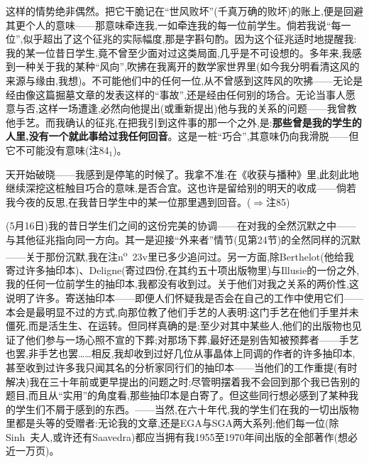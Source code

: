 这样的情势绝非偶然。把它干脆记在“世风败坏”(千真万确的败坏)的账上,便是回避其更个人的意味——那意味牵连我,一如牵连我的每一位前学生。倘若我说“每一位”,似乎超出了这个征兆的实际幅度,那是字斟句酌。因为这个征兆适时地提醒我:我的某一位昔日学生,竟不曾至少面对过这类局面,几乎是不可设想的。多年来,我感到一种关于我的某种“风向”,吹拂在我离开的数学家世界里(如今我分明看清这风的来源与缘由,我想)。不可能他们中的任何一位,从不曾感到这阵风的吹拂——无论是经由像这篇掘墓文章的发表这样的“事故”,还是经由任何别的场合。无论当事人愿意与否,这样一场遭逢,必然向他提出(或重新提出)他与我的关系的问题——我曾教他手艺。而我确认的征兆,在把我引到这件事的那一个之外,是:\textbf{那些曾是我的学生的人里,没有一个就此事给过我任何回音}。这是一桩“巧合”,其意味仍向我滑脱——但它不可能没有意味(注84$_{1}$)。

天开始破晓——我感到是停笔的时候了。我拿不准:在《收获与播种》里,此刻此地继续深挖这桩触目巧合的意味,是否合宜。这也许是留给别的明天的收成——倘若我今夜的反思,在我昔日学生中的某一位那里遇到回音。($\Rightarrow$注85)


(5月16日)我的昔日学生们之间的这份完美的协调——在对我的全然沉默之中——与其他征兆指向同一方向。其一是迎接“外来者”情节(见第24节)的全然同样的沉默——关于那份沉默,我在注n\textsuperscript{o}~23v里已多少追问过。另一方面,除Berthelot(他给我寄过许多抽印本)、Deligne(寄过四份,在其约五十项出版物里)与Illusie的一份之外,我的任何一位前学生的抽印本,我都没有收到过。关于他们对我之关系的两价性,这说明了许多。寄送抽印本——即便人们怀疑我是否会在自己的工作中使用它们——本会是最明显不过的方式,向那位教了他们手艺的人表明:这门手艺在他们手里并未僵死,而是活生生、在运转。但同样真确的是:至少对其中某些人,他们的出版物也见证了他们参与一场心照不宣的下葬;对那场下葬,最好还是别告知被预葬者——手艺也罢,非手艺也罢……相反,我却收到过好几位从事晶体上同调的作者的许多抽印本,甚至收到过许多我只闻其名的分析家同行们的抽印本——当他们的工作重提(有时解决)我在三十年前或更早提出的问题之时;尽管明摆着我不会回到那个我已告别的题目,而且从“实用”的角度看,那些抽印本是白寄了。但这些同行想必感到了某种我的学生们不屑于感到的东西。——当然,在六十年代,我的学生们在我的一切出版物里都是头等的受赠者:无论我的文章,还是EGA与SGA两大系列;他们每一位(除Sinh~夫人,或许还有Saavedra)都应当拥有我1955至1970年间出版的全部著作(想必近一万页)。

